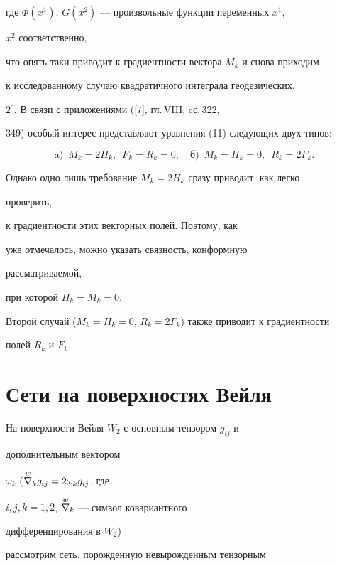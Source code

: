 где $\Phi(x^1)$, $G(x^2)$ --- произвольные функции переменных $x^1$, 


$x^2$ соответственно, 


что опять-таки приводит к градиентности вектора $M_k$ и снова приходим  


к исследованному случаю квадратичного интеграла геодезических. 


 


$2^\circ$. В связи с приложениями ([7], гл.\,VIII, cс.\,322, 


349) особый интерес представляют уравнения (11) следующих двух типов: 


$$ 


\text{a)}\ \; M_k=2H_k,\ \; F_k=R_k=0,\quad 


\text{б)}\ \; M_k=H_k=0,\ \; R_k=2F_k. 


$$ 


Однако одно лишь требование $M_k=2H_k$ сразу приводит, как легко 


проверить, 


к градиентности этих векторных полей. Поэтому, как 


уже отмечалось, можно указать связность, конформную


рассматриваемой,  


при которой $H_k=M_k=0$. 


 


Второй случай ($M_k=H_k=0$, $R_k=2F_k$) также приводит к градиентности  


полей $R_k$ и $F_k$. 


 


\section{Сети на поверхностях Вейля} 


 


На поверхности Вейля $W_2$ с основным тензором $g_{ij}$ и 


дополнительным вектором 


$\omega_k$ ($\overset{w}{\nabla}{}_k g_{ij}=2\omega_k g_{ij}$, где 


$i,j,k=1,2$, $\overset{w}{\nabla}{}_k$ --- символ ковариантного 


дифференцирования в $W_2$) 


рассмотрим сеть, порожденную невырожденным тензорным 


